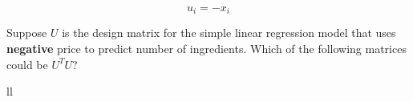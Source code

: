 \documentclass[twoside,12pt]{article}
\begin{document}
\begin{probset}
\begin{prob}[(8 pts)]
\begin{subprobset}
\begin{subprob}
$$u_i = - x_i$$











Suppose $U$ is the design matrix for the simple linear regression model that uses \textbf{negative} price to predict number of ingredients. Which of the following matrices could be $U^TU$?

\vspace{0.1in}

\begin{tabular}{ll}





\end{tabular}


\end{subprob}
\end{subprobset}
\end{prob}
\end{probset}
\end{document}

